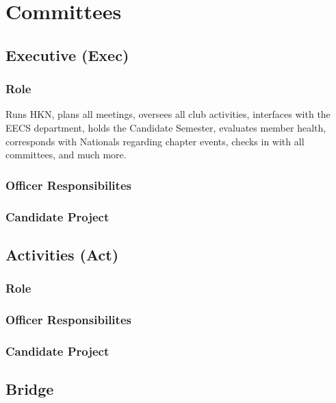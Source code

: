 \documentclass[11pt, article, oneside]{memoir}
\begin{document}

    \newpage
    \chapter{Committees}
    \section{Executive (Exec)}
    \subsection{Role}
        Runs HKN, plans all meetings, oversees all club activities, interfaces with the EECS department, holds the Candidate Semester, evaluates member health, corresponds with Nationals regarding chapter events, checks in with all committees, and much more.

    \subsection{Officer Responsibilites}

    \subsection{Candidate Project}

    \bigbreak



    \section{Activities (Act)}
    \subsection{Role}

    \subsection{Officer Responsibilites}

    \subsection{Candidate Project}

    \section{Bridge}
\end{document}
